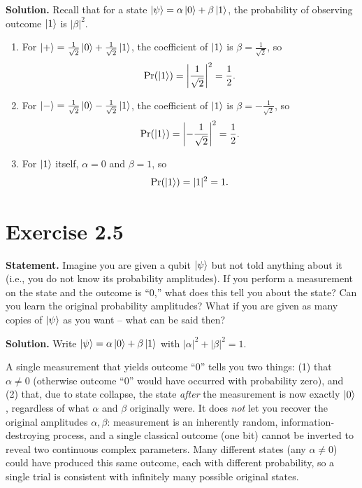 \documentclass[11pt]{article}
\begin{document}
\textbf{Solution.} Recall that for a state $\ket{\psi} = \alpha\ket{0} + \beta\ket{1}$, the probability of observing outcome $\ket{1}$ is $|\beta|^2$.
\begin{enumerate}
    \item For $\ket{+} = \frac{1}{\sqrt{2}}\ket{0} + \frac{1}{\sqrt{2}}\ket{1}$, the coefficient of $\ket{1}$ is $\beta = \frac{1}{\sqrt{2}}$, so
    \[
    \Pr(\ket{1}) = \left|\frac{1}{\sqrt{2}}\right|^2 = \frac{1}{2}.
    \]
    \item For $\ket{-} = \frac{1}{\sqrt{2}}\ket{0} - \frac{1}{\sqrt{2}}\ket{1}$, the coefficient of $\ket{1}$ is $\beta = -\frac{1}{\sqrt{2}}$, so
    \[
    \Pr(\ket{1}) = \left|-\frac{1}{\sqrt{2}}\right|^2 = \frac{1}{2}.
    \]
    \item For $\ket{1}$ itself, $\alpha = 0$ and $\beta = 1$, so
    \[
    \Pr(\ket{1}) = |1|^2 = 1.
    \]
\end{enumerate}

\section*{Exercise 2.5}
\textbf{Statement.} Imagine you are given a qubit $\ket{\psi}$ but not told anything about it (i.e., you do not know its probability amplitudes). If you perform a measurement on the state and the outcome is ``0,'' what does this tell you about the state? Can you learn the original probability amplitudes? What if you are given as many copies of $\ket{\psi}$ as you want -- what can be said then?

\textbf{Solution.} Write $\ket{\psi} = \alpha\ket{0} + \beta\ket{1}$ with $|\alpha|^2 + |\beta|^2 = 1$.

A single measurement that yields outcome ``0'' tells you two things: (1) that $\alpha \neq 0$ (otherwise outcome ``0'' would have occurred with probability zero), and (2) that, due to state collapse, the state \emph{after} the measurement is now exactly $\ket{0}$, regardless of what $\alpha$ and $\beta$ originally were. It does \emph{not} let you recover the original amplitudes $\alpha, \beta$: measurement is an inherently random, information-destroying process, and a single classical outcome (one bit) cannot be inverted to reveal two continuous complex parameters. Many different states (any $\alpha \neq 0$) could have produced this same outcome, each with different probability, so a single trial is consistent with infinitely many possible original states.
\end{document}
